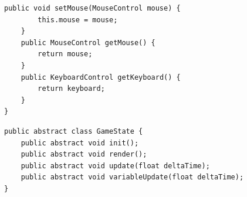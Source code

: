 \documentclass[12pt, 
openright, 
oneside, 
a4paper,    
brazil]{facom-ufu-abntex2}
\begin{document}
\begin{apendicesenv}
\begin{lstlisting}[caption=Classe GSM]
	public void setMouse(MouseControl mouse) {
		this.mouse = mouse;
	}
	public MouseControl getMouse() {
		return mouse;
	}
	public KeyboardControl getKeyboard() {
		return keyboard;
	}
}
\end{lstlisting}

\begin{lstlisting}[caption=Classe GameState]
public abstract class GameState {
	public abstract void init();
	public abstract void render();
	public abstract void update(float deltaTime);
	public abstract void variableUpdate(float deltaTime);
}
\end{lstlisting}



\end{apendicesenv}












\printindex
\end{document}
